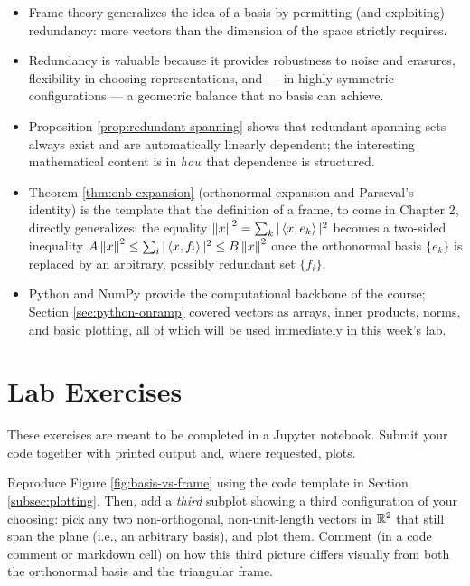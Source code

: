 \begin{itemize}
  \item Frame theory generalizes the idea of a basis by permitting (and exploiting) redundancy: more vectors than the dimension of the space strictly requires.
  \item Redundancy is valuable because it provides robustness to noise and erasures, flexibility in choosing representations, and --- in highly symmetric configurations --- a geometric balance that no basis can achieve.
  \item Proposition \ref{prop:redundant-spanning} shows that redundant spanning sets always exist and are automatically linearly dependent; the interesting mathematical content is in \emph{how} that dependence is structured.
  \item Theorem \ref{thm:onb-expansion} (orthonormal expansion and Parseval's identity) is the template that the definition of a frame, to come in Chapter 2, directly generalizes: the equality $\left\| x \right\|^2 = \sum_k |\left\langle x, e_k \right\rangle|^2$ becomes a two-sided inequality $A\left\| x \right\|^2 \le \sum_i |\left\langle x, f_i \right\rangle|^2 \le B \left\| x \right\|^2$ once the orthonormal basis $\{e_k\}$ is replaced by an arbitrary, possibly redundant set $\{f_i\}$.
  \item Python and NumPy provide the computational backbone of the course; Section \ref{sec:python-onramp} covered vectors as arrays, inner products, norms, and basic plotting, all of which will be used immediately in this week's lab.
\end{itemize}

\section{Lab Exercises}
\label{sec:lab}

These exercises are meant to be completed in a Jupyter notebook. Submit your code together with printed output and, where requested, plots.

\begin{exercisebox}[title={Lab Exercise 1.1: Basis vs.\ Frame, Visually}]
Reproduce Figure \ref{fig:basis-vs-frame} using the code template in Section \ref{subsec:plotting}. Then, add a \emph{third} subplot showing a third configuration of your choosing: pick any two non-orthogonal, non-unit-length vectors in $\mathbb{R}^2$ that still span the plane (i.e., an arbitrary basis), and plot them. Comment (in a code comment or markdown cell) on how this third picture differs visually from both the orthonormal basis and the triangular frame.
\end{exercisebox}

